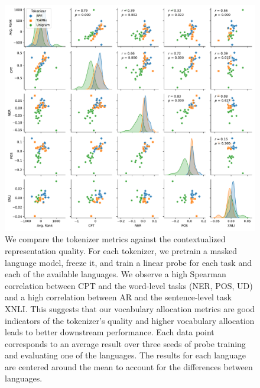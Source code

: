 



\begin{figure}
    \centering
    \includegraphics[width=\textwidth]{figures/pair_analysis_20L.pdf}
    \caption{We compare the tokenizer metrics against the contextualized representation quality. For each tokenizer, we pretrain a masked language model, freeze it, and train a linear probe for each task and each of the available languages. We observe a high Spearman correlation between CPT and the word-level tasks (NER, POS, UD) and a high correlation between AR and the sentence-level task XNLI. This suggests that our vocabulary allocation metrics are good indicators of the tokenizer's quality and higher vocabulary allocation leads to better downstream performance. Each data point corresponds to an average result over three seeds of probe training and evaluating one of the languages. The results for each language are centered around the mean to account for the differences between languages.}
    \label{fig:pair_analysis_20L}
\end{figure}

